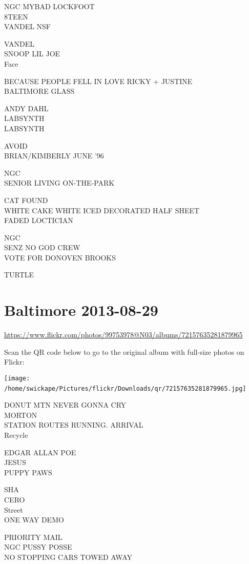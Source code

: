 \documentclass[10pt,letterpaper]{article}
\begin{document}
NGC MYBAD LOCKFOOT\\
8TEEN\\
VANDEL NSF

VANDEL\\
SNOOP LIL JOE\\
Face

BECAUSE PEOPLE FELL IN LOVE RICKY + JUSTINE\\
BALTIMORE GLASS

ANDY DAHL\\
LABSYNTH\\
LABSYNTH

AVOID\\
BRIAN/KIMBERLY JUNE '96

NGC\\
SENIOR LIVING ON{-}THE{-}PARK

CAT FOUND\\
WHITE CAKE WHITE ICED DECORATED HALF SHEET\\
FADED LOCTICIAN

NGC\\
SENZ NO GOD CREW\\
VOTE FOR DONOVEN BROOKS

TURTLE
\

\section*{Baltimore 2013-08-29}

\url{https://www.flickr.com/photos/99753978@N03/albums/72157635281879965}

Scan the QR code below to go to the original album with full-size photos on Flickr:

\texttt{[image: /home/swickape/Pictures/flickr/Downloads/qr/72157635281879965.jpg]}
\

DONUT MTN NEVER GONNA CRY\\
MORTON\\
STATION ROUTES RUNNING. ARRIVAL\\
Recycle

EDGAR ALLAN POE\\
JESUS\\
PUPPY PAWS

SHA\\
CERO\\
Street\\
ONE WAY DEMO

PRIORITY MAIL\\
NGC PUSSY POSSE\\
NO STOPPING CARS TOWED AWAY
\end{document}
